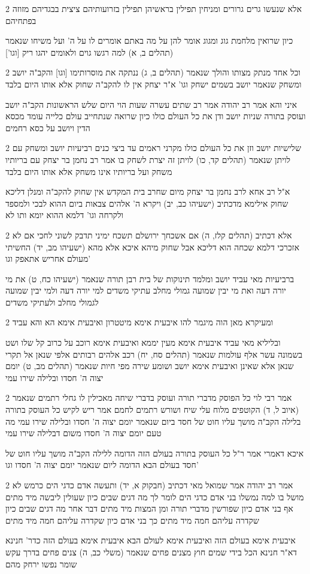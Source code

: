 \documentclass[12pt, openany]{book}
\newcommand{\sethebfont}{
\fontsize{10.5pt}{21.0pt} \selectfont
}
\newcommand{\twocol}[1]{
	{\sethebfont \begin{multicols}{2}
			#1
	\end{multicols}}	
}
\begin{document}
\twocol{אלא שנעשו גרים גרורים ומניחין תפילין בראשיהן תפילין בזרועותיהם ציצית בבגדיהם מזוזה בפתחיהם
\par כיון שרואין מלחמת גוג ומגוג אומר להן על מה באתם אומרים לו על ה' ועל משיחו שנאמר (תהלים ב, א) למה רגשו גוים ולאומים יהגו ריק [וגו']}
\twocol{וכל אחד מנתק מצותו והולך שנאמר (תהלים ב, ג) ננתקה את מוסרותימו [וגו] והקב"ה יושב ומשחק שנאמר יושב בשמים ישחק וגו' א"ר יצחק אין לו להקב"ה שחוק אלא אותו היום בלבד
\par איני והא אמר רב יהודה אמר רב שתים עשרה שעות הוי היום שלש הראשונות הקב"ה יושב ועוסק בתורה שניות יושב ודן את כל העולם כולו כיון שרואה שנתחייב עולם כלייה עומד מכסא הדין ויושב על כסא רחמים}
\twocol{שלישיות יושב וזן את כל העולם כולו מקרני ראמים עד ביצי כנים רביעיות יושב ומשחק עם לויתן שנאמר (תהלים קד, כו) לויתן זה יצרת לשחק בו אמר רב נחמן בר יצחק עם בריותיו משחק ועל בריותיו אינו משחק אלא אותו היום בלבד
\par א"ל רב אחא לרב נחמן בר יצחק מיום שחרב בית המקדש אין שחוק להקב"ה ומנלן דליכא שחוק אילימא מדכתיב (ישעיהו כב, יב) ויקרא ה' אלהים צבאות ביום ההוא לבכי ולמספד ולקרחה וגו' דלמא ההוא יומא ותו לא}
\twocol{אלא דכתיב (תהלים קלז, ה) אם אשכחך ירושלם תשכח ימיני תדבק לשוני לחכי אם לא אזכרכי דלמא שכחה הוא דליכא אבל שחוק מיהא איכא אלא מהא (ישעיהו מב, יד) החשיתי מעולם אחריש אתאפק וגו'
\par ברביעיות מאי עביד יושב ומלמד תינוקות של בית רבן תורה שנאמר (ישעיהו כח, ט) את מי יורה דעה ואת מי יבין שמועה גמולי מחלב עתיקי משדים למי יורה דעה ולמי יבין שמועה לגמולי מחלב ולעתיקי משדים}
\twocol{ומעיקרא מאן הוה מיגמר להו איבעית אימא מיטטרון ואיבעית אימא הא והא עביד
\par ובליליא מאי עביד איבעית אימא מעין יממא ואיבעית אימא רוכב על כרוב קל שלו ושט בשמונה עשר אלף עולמות שנאמר (תהלים סח, יח) רכב אלהים רבותים אלפי שנאן אל תקרי שנאן אלא שאינן ואיבעית אימא יושב ושומע שירה מפי חיות שנאמר (תהלים מב, ט) יומם יצוה ה' חסדו ובלילה שירו עמי}
\twocol{אמר רבי לוי כל הפוסק מדברי תורה ועוסק בדברי שיחה מאכילין לו גחלי רתמים שנאמר (איוב ל, ד) הקוטפים מלוח עלי שיח ושורש רתמים לחמם אמר ריש לקיש כל העוסק בתורה בלילה הקב"ה מושך עליו חוט של חסד ביום שנאמר יומם יצוה ה' חסדו ובלילה שירו עמי מה טעם יומם יצוה ה' חסדו משום דבלילה שירו עמי
\par איכא דאמרי אמר ר"ל כל העוסק בתורה בעולם הזה הדומה ללילה הקב"ה מושך עליו חוט של חסד בעולם הבא הדומה ליום שנאמר יומם יצוה ה' חסדו וגו'}
\twocol{אמר רב יהודה אמר שמואל מאי דכתיב (חבקוק א, יד) ותעשה אדם כדגי הים כרמש לא מושל בו למה נמשלו בני אדם כדגי הים לומר לך מה דגים שבים כיון שעולין ליבשה מיד מתים אף בני אדם כיון שפורשין מדברי תורה ומן המצות מיד מתים דבר אחר מה דגים שבים כיון שקדרה עליהם חמה מיד מתים כך בני אדם כיון שקדרה עליהם חמה מיד מתים
\par איבעית אימא בעולם הזה ואיבעית אימא לעולם הבא איבעית אימא בעולם הזה כדר' חנינא דא"ר חנינא הכל בידי שמים חוץ מצנים פחים שנאמר (משלי כב, ה) צנים פחים בדרך עקש שומר נפשו ירחק מהם}
\end{document}
